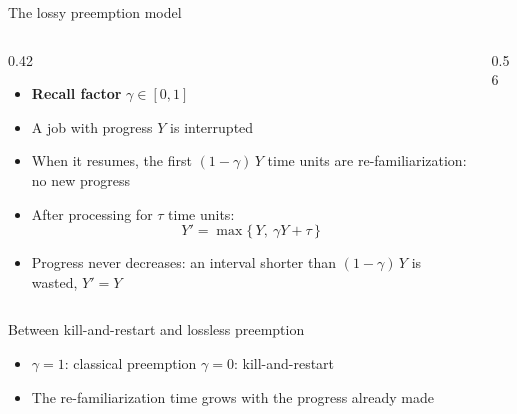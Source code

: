 \documentclass[aspectratio=169,11pt]{beamer}
\begin{document}
\begin{frame}{The lossy preemption model}
  \begin{columns}[c]
    \begin{column}{0.42\textwidth}
      \begin{itemize}
        \item \textbf{Recall factor} $\gamma \in [0,1]$
        \item A job with progress $Y$ is interrupted
        \item When it resumes, the first $(1-\gamma)\,Y$ time units are
              \alert{re-familiarization}: no new progress
        \item After processing for $\tau$ time units:
              \[ Y' = \max\{\,Y,\ \gamma Y + \tau\,\} \]
        \item \alert{Progress never decreases:} an interval shorter than
              $(1-\gamma)\,Y$ is wasted, $Y' = Y$
      \end{itemize}
    \end{column}
    \begin{column}{0.56\textwidth}
      \centering
      
    \end{column}
  \end{columns}
\end{frame}

\begin{frame}{Between kill-and-restart and lossless preemption}
  \centering
  
  \vfill
  \begin{itemize}
    \item $\gamma = 1$: classical preemption \qquad $\gamma = 0$: kill-and-restart
    \item The re-familiarization time grows with the progress already made
  \end{itemize}
\end{frame}
\end{document}
